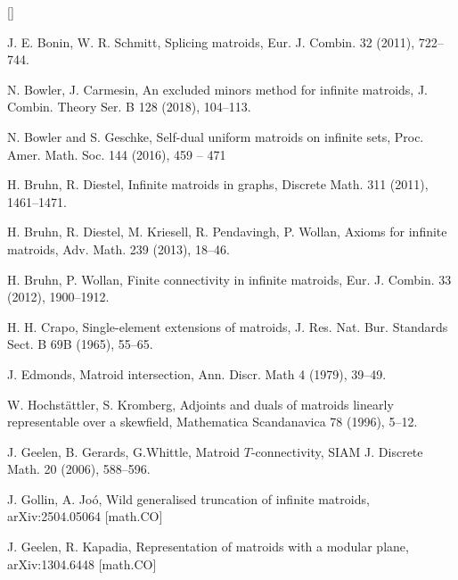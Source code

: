 \documentclass{amsart}
\theoremstyle{plain}
\theoremstyle{definition}
\begin{document}

\begin{list}{[]}
{\setlength{\leftmargin}{10mm}\setlength{\itemsep}{0mm}}

\item\label{bs09}
J. E. Bonin, W. R. Schmitt,
Splicing matroids,
Eur. J. Combin. 32 (2011), 722--744. 

\item\label{bc18}
N. Bowler, J. Carmesin,
An excluded minors method for infinite matroids,
J. Combin. Theory Ser. B 128 (2018), 104--113. 

\item\label{bg}
N. Bowler and S. Geschke, 
Self-dual uniform matroids on infinite sets, 
Proc. Amer. Math. Soc. 144 (2016), 459 -- 471

\item\label{bd11}
H. Bruhn, R. Diestel, 
Infinite matroids in graphs, 
Discrete Math. 311 (2011), 1461--1471. 

\item\label{bdkpw}
H. Bruhn, R. Diestel, M. Kriesell, R. Pendavingh, P. Wollan, 
Axioms for infinite matroids,
Adv. Math. 239 (2013), 18--46. 

\item\label{bw12}
H. Bruhn, P. Wollan, 
Finite connectivity in infinite matroids, 
Eur. J. Combin. 33 (2012), 1900--1912.  

\item\label{crapo65}
H. H. Crapo,
Single-element extensions of matroids, 
J. Res. Nat. Bur. Standards Sect. B 69B (1965), 55--65. 

\item\label{edmonds}
J. Edmonds, 
Matroid intersection,
Ann. Discr. Math 4 (1979), 39--49.

\item\label{hk96}
W. Hochst\"attler, S. Kromberg,
Adjoints and duals of matroids linearly representable over a skewfield,
Mathematica Scandanavica 78 (1996), 5--12. 

\item\label{ggw06}
J. Geelen, B. Gerards, G.Whittle,
Matroid $T$-connectivity, 
SIAM J. Discrete Math. 20 (2006), 588--596.

\item\label{gj25}
J. Gollin, A. Jo\'o,
Wild generalised truncation of infinite matroids,
arXiv:2504.05064 [math.CO]

\item\label{gk13}
J. Geelen, R. Kapadia, 
Representation of matroids with a modular plane, 
arXiv:1304.6448 [math.CO]


\end{list}
\end{document}
